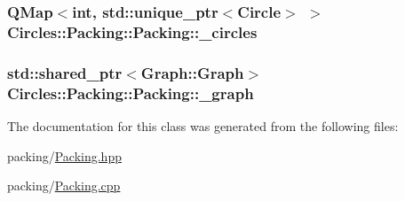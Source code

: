 \subsubsection[{\+\_\+circles}]{\setlength{\rightskip}{0pt plus 5cm}Q\+Map$<$int, std\+::unique\+\_\+ptr$<${\bf Circle}$>$ $>$ Circles\+::\+Packing\+::\+Packing\+::\+\_\+circles\hspace{0.3cm}{\ttfamily [protected]}}\label{class_circles_1_1_packing_1_1_packing_a34a1ece667f3111c1eb434ee7660b31a}
\hypertarget{class_circles_1_1_packing_1_1_packing_aafdbbfa163315d47de5805b7eb55c549}{}
\subsubsection[{\+\_\+graph}]{\setlength{\rightskip}{0pt plus 5cm}std\+::shared\+\_\+ptr$<${\bf Graph\+::\+Graph}$>$ Circles\+::\+Packing\+::\+Packing\+::\+\_\+graph\hspace{0.3cm}{\ttfamily [protected]}}\label{class_circles_1_1_packing_1_1_packing_aafdbbfa163315d47de5805b7eb55c549}


The documentation for this class was generated from the following files\+:\begin{DoxyCompactItemize}
\item 
packing/\hyperlink{packing_2_packing_8hpp}{Packing.\+hpp}\item 
packing/\hyperlink{packing_2_packing_8cpp}{Packing.\+cpp}\end{DoxyCompactItemize}
